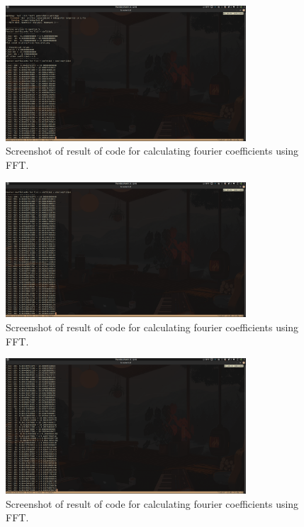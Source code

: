 \documentclass[12pt, letterpaper]{article}
\theoremstyle{nonumberplain}
\begin{document}
\begin{figure}[!htbp]
	\centering
	\includegraphics[width=0.8\textwidth]{numhw3-q5-1-1.png}
	\caption{Screenshot of result of code for calculating fourier coefficients using FFT.}
\end{figure}

\begin{figure}[!htbp]
	\centering
	\includegraphics[width=0.8\textwidth]{numhw3-q5-1-2.png}
	\caption{Screenshot of result of code for calculating fourier coefficients using FFT.}
\end{figure}

\begin{figure}[!htbp]
	\centering
	\includegraphics[width=0.8\textwidth]{numhw3-q5-1-3.png}
	\caption{Screenshot of result of code for calculating fourier coefficients using FFT.}
\end{figure}
\end{document}
